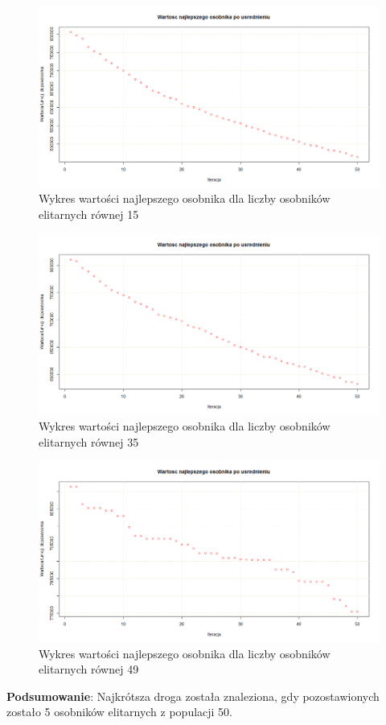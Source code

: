 \begin{figure}[H]
\centering

\includegraphics[scale=0.3]{IO_obrazy/brg180_elit_15}
\caption{Wykres wartości najlepszego osobnika dla liczby osobników elitarnych równej 15}
\end{figure}

\begin{figure}[H]
\centering

\includegraphics[scale=0.3]{IO_obrazy/brg180_elit_35}
\caption{Wykres wartości najlepszego osobnika dla liczby osobników elitarnych równej 35}
\end{figure}


\begin{figure}[H]
\centering

\includegraphics[scale=0.3]{IO_obrazy/brg180_elit_49}
\caption{Wykres wartości najlepszego osobnika dla liczby osobników elitarnych równej 49}
\end{figure}


\textbf{Podsumowanie}: Najkrótsza droga została znaleziona, gdy pozostawionych zostało 5 osobników elitarnych z populacji 50.

\newpage